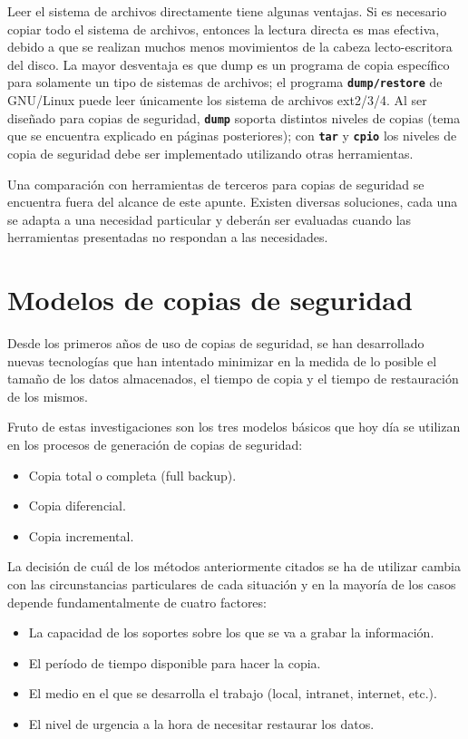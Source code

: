 \documentclass[12pt]{article}
\begin{document}
Leer el sistema de archivos directamente tiene algunas ventajas.
Si es necesario copiar todo el sistema de archivos, entonces la lectura 
directa es mas efectiva, debido a que se realizan muchos menos movimientos 
de la cabeza lecto-escritora del disco. La mayor desventaja es que dump es 
un programa de copia específico para solamente un tipo de sistemas de 
archivos; el programa \texttt{\textbf{dump/restore}} de GNU/Linux puede leer 
únicamente los sistema de archivos ext2/3/4. Al ser diseñado para copias
de seguridad, \texttt{\textbf{dump}} soporta distintos niveles de copias
 (tema que se encuentra explicado en páginas posteriores); con 
\texttt{\textbf{tar}} y \texttt{\textbf{cpio}} los niveles de copia de 
seguridad debe ser implementado utilizando otras herramientas.

Una comparación con herramientas de terceros para copias de seguridad se 
encuentra fuera del alcance de este apunte. Existen diversas soluciones, 
cada una se adapta a una necesidad particular y deberán ser evaluadas 
cuando las herramientas presentadas no respondan a las necesidades. 

\section*{Modelos de copias de seguridad}
Desde los primeros años de uso de copias de seguridad, se han desarrollado 
nuevas tecnologías que han intentado minimizar en la medida de lo posible 
el tamaño de los datos almacenados, el tiempo de copia y el tiempo de 
restauración de los mismos.

Fruto de estas investigaciones son los tres modelos básicos que hoy 
día se utilizan en los procesos de generación de copias de seguridad:
\begin{itemize}
\item Copia total o completa (full backup).
\item Copia diferencial.
\item Copia incremental.
\end{itemize}

La decisión de cuál de los métodos anteriormente citados se ha de 
utilizar cambia con las circunstancias particulares de cada situación 
y en la mayoría de los casos depende fundamentalmente de cuatro factores:

\begin{itemize}
\item La capacidad de los soportes sobre los que se va a grabar la 
información.
\item El período de tiempo disponible para hacer la copia.
\item El medio en el que se desarrolla el trabajo (local, intranet, 
internet, etc.).
\item El nivel de urgencia a la hora de necesitar restaurar los datos.
\end{itemize}
\end{document}
